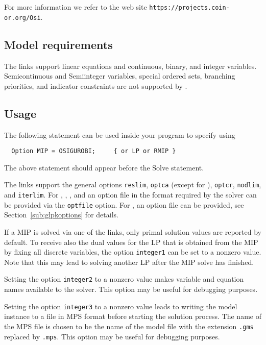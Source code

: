 For more information we refer to the \OSI web site \texttt{https://projects.coin-or.org/Osi}.

\subsection{Model requirements}

The \OSI links support linear equations and continuous, binary, and integer variables.
Semicontinuous and Semiinteger variables, special ordered sets, branching priorities, and indicator constraints are not supported by \OSI.

\subsection{Usage}

The following statement can be used inside your \MYGAMS program to specify using \OSIGUROBI
\begin{verbatim}
  Option MIP = OSIGUROBI;     { or LP or RMIP }
\end{verbatim}

The above statement should appear before the Solve statement.

The links support the general \MYGAMS options \texttt{reslim}, \texttt{optca} (except for \OSIGLPK), \texttt{optcr}, \texttt{nodlim}, and \texttt{iterlim}.
For \OSICPLEX, \OSIGUROBI, \OSIMOSEK, and \OSIXPRESS an option file in the format required by the solver can be provided via the \MYGAMS \texttt{optfile} option.
For \OSIGLPK, an \MYGAMS option file can be provided, see Section~\ref{sub:glpkoptions} for details.

If a MIP is solved via one of the \OSI links, only primal solution values are reported by default.
To receive also the dual values for the LP that is obtained from the MIP by fixing all discrete variables, the \MYGAMS option \texttt{integer1} can be set to a nonzero value. Note that this may lead to solving another LP after the MIP solve has finished.

Setting the \MYGAMS option \texttt{integer2} to a nonzero value makes variable and equation names available to the solver.
This option may be useful for debugging purposes.

Setting the \MYGAMS option \texttt{integer3} to a nonzero value leads to writing the model instance to a file in MPS format before starting the solution process.
The name of the MPS file is chosen to be the name of the \MYGAMS model file with the extension \texttt{.gms} replaced by \texttt{.mps}.
This option may be useful for debugging purposes.

